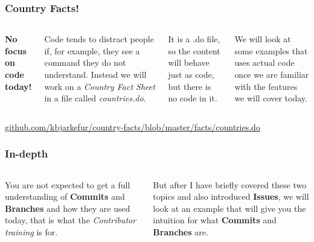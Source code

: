 \documentclass[aspectratio=169]{beamer} %
\newcommand{\trainingURL}[1]{{\color{blue}\url{#1}}}
\newcommand{\traininerUsername}{kbjarkefur}
\newcommand{\repoName}{\traininerUsername/country-facts}
\newcommand{\trainingRepoURL}[1]{\trainingURL{github.com/\repoName #1}}
\begin{document}
\begin{frame}
	\frametitle{Country Facts!}

	\begin{columns}[c]


		\textbf{No focus on code today!}

		\vspace{.25cm}

		Code tends to distract people if, for example, they see a command they do not understand. Instead we will work on a \textit{Country Fact Sheet} in a file called \textit{countries.do}.

		\vspace{.25cm}

		It is a .do file, so the content will behave just as code, but there is no code in it.

		\vspace{.25cm}

		We will look at some examples that uses actual code once we are familiar with the features we will cover today.


	\end{columns}

	\vspace{.55cm}
	\trainingRepoURL{/blob/master/facts/countries.do}


\end{frame}

\begin{frame}
	\frametitle{In-depth}

	\begin{columns}[c]



		You are not expected to get a full understanding of \textbf{Commits} and \textbf{Branches} and how they are used today, that is what the \textit{Contributor training} is for.

		\vspace{.5cm}

		But after I have briefly covered these two topics and also introduced \textbf{Issues}, we will look at an example that will give you the intuition for what \textbf{Commits} and \textbf{Branches} are.


	\end{columns}

\end{frame}
\end{document}
